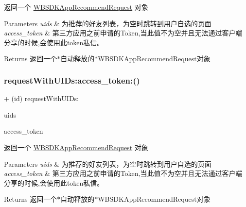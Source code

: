 返回一个 \mbox{\hyperlink{interface_w_b_s_d_k_app_recommend_request}{W\+B\+S\+D\+K\+App\+Recommend\+Request}} 对象


\begin{DoxyParams}{Parameters}
{\em uids} & 为推荐的好友列表，为空时跳转到用户自选的页面 \\
\hline
{\em access\+\_\+token} & 第三方应用之前申请的\+Token,当此值不为空并且无法通过客户端分享的时候,会使用此token私信。 \\
\hline
\end{DoxyParams}
\begin{DoxyReturn}{Returns}
返回一个$\ast$自动释放的$\ast$\+W\+B\+S\+D\+K\+App\+Recommend\+Request对象 
\end{DoxyReturn}
\mbox{\label{interface_w_b_s_d_k_app_recommend_request_acc546a201fde3801e2aa5adc4957ca24}} 
\subsubsection{\texorpdfstring{request\+With\+U\+I\+Ds\+:access\+\_\+token\+:()}{requestWithUIDs:access\_token:()}\hspace{0.1cm}{\footnotesize\ttfamily [3/3]}}
{\footnotesize\ttfamily + (id) request\+With\+U\+I\+Ds\+: \begin{DoxyParamCaption}\item[{(N\+S\+Array $\ast$)}]{uids }\item[{access_token:(N\+S\+String $\ast$)}]{access\+\_\+token }\end{DoxyParamCaption}}

返回一个 \mbox{\hyperlink{interface_w_b_s_d_k_app_recommend_request}{W\+B\+S\+D\+K\+App\+Recommend\+Request}} 对象


\begin{DoxyParams}{Parameters}
{\em uids} & 为推荐的好友列表，为空时跳转到用户自选的页面 \\
\hline
{\em access\+\_\+token} & 第三方应用之前申请的\+Token,当此值不为空并且无法通过客户端分享的时候,会使用此token私信。 \\
\hline
\end{DoxyParams}
\begin{DoxyReturn}{Returns}
返回一个$\ast$自动释放的$\ast$\+W\+B\+S\+D\+K\+App\+Recommend\+Request对象 
\end{DoxyReturn}


